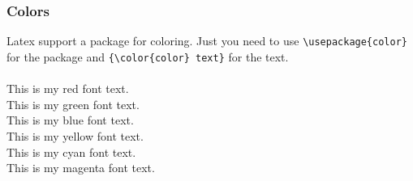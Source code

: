 \subsubsection{Colors}

Latex support a package for coloring. Just you need to use \verb|\usepackage{color}| for the package and \verb|{\color{color} text}| for the text.\\
\\
{\color{red} This is my red font text.}\\
{\color{green} This is my green font text.}\\
{\color{blue} This is my blue font text.}\\
{\color{yellow} This is my yellow font text.}\\
{\color{cyan} This is my cyan font text.}\\
{\color{magenta} This is my magenta font text.}\\